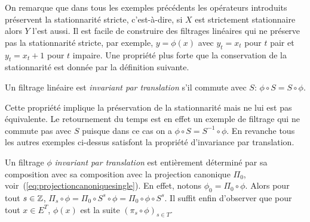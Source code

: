 On remarque que dans tous les exemples pr\'ec\'edents les op\'erateurs introduits
pr\'eservent la stationnarit\'e stricte,
c'est-\`a-dire, si $X$ est strictement stationnaire alors $Y$ l'est
aussi. Il est facile de construire des
filtrages lin\'eaires qui ne pr\'eserve pas la stationnarit\'e stricte, par exemple,
$y=\phi(x)$ avec $y_t=x_t$ pour $t$ pair et $y_t=x_t+1$ pour $t$ impaire. Une propri\'et\'e plus
forte que la conservation de la stationnarit\'e est donn\'ee par la d\'efinition
suivante.

\begin{definition}
  Un filtrage lin\'eaire est \emph{invariant par translation} s'il commute avec
  $S$: $\phi\circ S=S\circ \phi$.
\end{definition}

Cette propri\'et\'e implique la pr\'eservation de la stationnarit\'e mais ne lui est
pas \'equivalente. Le retournement du temps est en effet un exemple de filtrage
qui ne commute pas avec $S$ puisque dans ce cas on a $\phi\circ S=S^{-1}\circ
\phi$.  En revanche tous les autres exemples ci-dessus satisfont la propri\'et\'e
d'invariance par translation.

\begin{remark}
\label{rem:FiltrageInvTrans}
Un filtrage $\phi$ \emph{invariant par translation} est enti\`erement
d\'etermin\'e par sa composition avec sa composition avec la projection canonique
$\Pi_0$,
voir~(\ref{eq:projectioncanoniquesingle}). En effet, notons
$\phi_0=\Pi_0\circ\phi$. Alors pour tout $s\in \mathbb{Z}$, $\Pi_s\circ\phi=
\Pi_0\circ S^{s}\circ\phi=\Pi_0\circ\phi\circ S^{s}$. Il suffit enfin
d'observer que pour tout $x\in E^T$, $\phi(x)$ est la suite
$(\pi_s\circ\phi)_{s\in T}$.
\end{remark}










